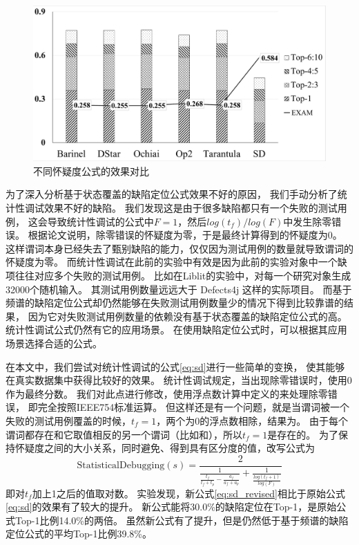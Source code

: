 
\begin{figure}[htbp] 
\centering 
\includegraphics[width=12cm]{figure/formulas} 
\caption{不同怀疑度公式的效果对比} 
\label{fig:formulas}
\end{figure}

为了深入分析基于状态覆盖的缺陷定位公式效果不好的原因，
我们手动分析了统计性调试效果不好的缺陷。
我们发现这是由于很多缺陷都只有一个失败的测试用例，
这会导致统计性调试的公式中$F = 1$，然后$log(t_f) / log(F)$中发生除零错误。
根据论文说明，除零错误的怀疑度为零，于是最终计算得到的怀疑度为0。
这样谓词本身已经失去了甄别缺陷的能力，仅仅因为测试用例的数量就导致谓词的怀疑度为零。
而统计性调试在此前的实验中有效是因为此前的实验对象中一个缺项往往对应多个失败的测试用例。
比如在Liblit\parencite{Liblit2005Scalable}的实验中，对每一个研究对象生成32000个随机输入。
其测试用例数量远远大于 Defects4j 这样的实际项目。
而基于频谱的缺陷定位公式却仍然能够在失败测试用例数量少的情况下得到比较靠谱的结果，
因为它对失败测试用例数量的依赖没有基于状态覆盖的缺陷定位公式的高。
统计性调试公式仍然有它的应用场景。
在使用缺陷定位公式时，可以根据其应用场景选择合适的公式。

在本文中，我们尝试对统计性调试的公式\ref{eq:sd}进行一些简单的变换，
使其能够在真实数据集中获得比较好的效果。
统计性调试规定，当出现除零错误时，使用0作为最终分数。
我们对此点进行修改，使用浮点数计算中定义的来处理除零错误，
即完全按照IEEE754标准运算。
但这样还是有一个问题，就是当谓词被一个失败的测试用例覆盖的时候，$t_f = 1$，两个为0的浮点数相除，结果为。
由于每个谓词都存在和它取值相反的另一个谓词（比如和），所以$t_f = 1$是存在的。
为了保持怀疑度之间的大小关系，同时避免、得到具有区分度的值，改写公式为
\begin{equation}
\mathrm{StatisticalDebugging}(s) = \frac{2}{\frac{1}{\frac{t_f}{t_f + t_p} - \frac{a_f}{a_f + a_p}} + \frac{1}{\frac{log(t_f + 1)}{log(F)}}}\label{eq:sd_revised}
\end{equation}
即对$t_f$加上1之后的值取对数。
实验发现，新公式\ref{eq:sd_revised}相比于原始公式\ref{eq:sd}的效果有了较大的提升。
新公式能将30.0\%的缺陷定位在Top-1，是原始公式Top-1比例14.0\%的两倍。
虽然新公式有了提升，但是仍然低于基于频谱的缺陷定位公式的平均Top-1比例39.8\%。

